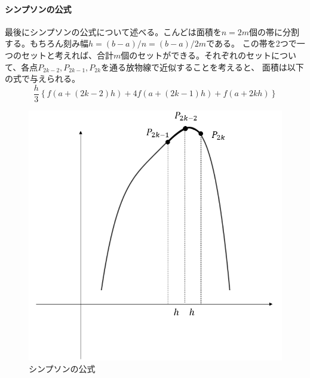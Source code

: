 \documentclass[a4j,dvipdfmx]{jsarticle}
\begin{document}
                \paragraph{シンプソンの公式}最後にシンプソンの公式について述べる。こんどは面積を$n=2m$個の帯に分割する。もちろん刻み幅$h=(b-a)/n=(b-a)/2m$である。
                この帯を2つで一つのセットと考えれば、合計$m$個のセットができる。それぞれのセットについて、各点$P_{2k-2},P_{2k-1},P_{2k}$を通る放物線で近似することを考えると、
                面積は以下の式で与えられる。
                \begin{equation}
                    \frac{h}{3}\left\{f(a+(2k-2)h)+4f(a+(2k-1)h)+f(a+2kh)\right\} \label{eq:シンプソン各面積}
                \end{equation}
                
                \begin{figure}[h]
                    \centering
                    \includegraphics[scale=0.5]{img/QuuNote/simpsonLow.png}
                    \caption{シンプソンの公式}
                \end{figure}
\end{document}
